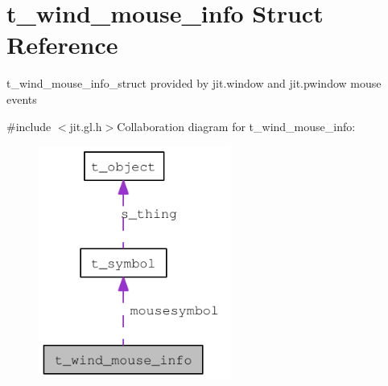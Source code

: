 \hypertarget{structt__wind__mouse__info}{
\section{t\_\-wind\_\-mouse\_\-info Struct Reference}
\label{structt__wind__mouse__info}
}


t\_\-wind\_\-mouse\_\-info\_\-struct provided by jit.window and jit.pwindow mouse events  


{\ttfamily \#include $<$jit.gl.h$>$}Collaboration diagram for t\_\-wind\_\-mouse\_\-info:\nopagebreak
\begin{figure}[H]
\begin{center}
\leavevmode
\includegraphics[width=179pt]{structt__wind__mouse__info__coll__graph}
\end{center}
\end{figure}
